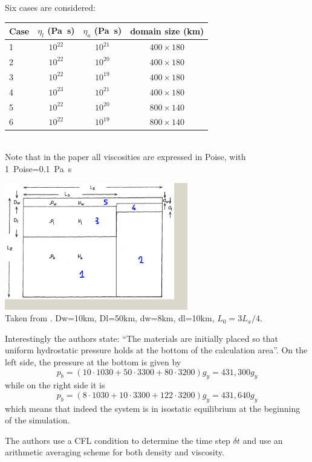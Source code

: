 Six cases are considered:
\begin{center}
\begin{tabular}{lccc}
Case & $\eta_l$ (\si{\pascal\second}) & $\eta_a$  (\si{\pascal\second}) & domain size (\si{\km})\\
\hline
1 & $10^{22}$ & $10^{21}$ & $400\times 180$\\
2 & $10^{22}$ & $10^{20}$ & $400\times 180$\\
3 & $10^{22}$ & $10^{19}$ & $400\times 180$\\
4 & $10^{23}$ & $10^{21}$ & $400\times 180$\\
\hline
5 & $10^{22}$ & $10^{20}$ & $800\times 140$\\
6 & $10^{22}$ & $10^{19}$ & $800\times 140$\\
\hline
\end{tabular}\\
{\captionfont Note that in the paper all viscosities are expressed in Poise, with 
1~Poise=0.1~\si{\pascal\second}}
\end{center}

\begin{center}
\includegraphics[width=8cm]{python_codes/fieldstone_118/images/mato83}\\
{\captionfont Taken from \textcite{mato83}. Dw=10km, Dl=50km, dw=8km, 
dl=10km, $L_0=3L_x/4$.  }
\end{center}

Interestingly the authors state: ``The materials are initially placed so that 
uniform hydrostatic pressure holds at the bottom of the calculation area''. 
On the left side, the pressure at the bottom is given by 
\[
p_b=(10\cdot 1030+50\cdot 3300+80\cdot3200)g_y = 431,300g_y
\]
while on the right side it is
\[
p_b=(8\cdot 1030+10\cdot 3300+122 \cdot3200)g_y = 431,640g_y
\]
which means that indeed the system is in isostatic equilibrium at the beginning of the 
simulation. 

The authors use a CFL condition to determine the time step $\delta t$ and use an arithmetic 
averaging scheme for both density and viscosity.

